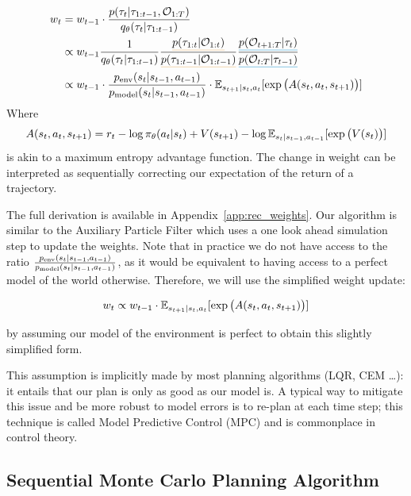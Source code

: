 \begin{align}
w_t 
&= w_{t-1} \cdot \frac{p(\traj_t |\traj_{1:t-1}, \gO_{1:T})}{q_\parampol(\traj_t | \traj_{1:t-1})} \nonumber\\
&\propto w_{t-1}   \frac{1}{ q_\parampol(\traj_t | \traj_{1:t-1})} \frac{\mathunderline{alpha}{p(\traj_{1:t} | \gO_{1:t})}}{ \mathunderline{alpha}{p(\traj_{1:t-1} | \gO_{1:t-1})}} \frac{ \mathunderline{beta}{p(\gO_{t+1:T} | \traj_{t})}}{ \mathunderline{beta}{p(\gO_{t:T} | \traj_{t-1})}}   \nonumber\\
&\propto w_{t-1} \cdot \frac{\penv(s_t | s_{t-1}, a_{t-1})}{\pmodel(s_t | s_{t-1}, a_{t-1})} \cdot \E_{s_{t+1} | s_t, a_t} [ \exp \big( A(s_t, a_t, s_{t+1}) \big)] \nonumber
\end{align}
Where \begin{equation}
\label{eq:maxent_advantage}
A(s_t, a_t, s_{t+1}) = r_t -  \log \pi_\theta(a_t | s_t) + V(s_{t+1}) - \log \mathbb{E}_{s_{t} | s_{t-1}, a_{t-1}} [ \exp \big( V(s_{t}) \big)]
\end{equation}
is akin to a maximum entropy advantage function. The change in weight can be interpreted as sequentially correcting our expectation of the return of a trajectory.


\noindent The full derivation is available in Appendix~\ref{app:rec_weights}. Our algorithm is similar to the Auxiliary Particle Filter \citep{pitt1999filtering} which uses a one look ahead simulation step to update the weights.
 Note that in practice we do not have access to the ratio $\frac{p_{\text{env}}(s_t | s_{t-1}, a_{t-1})}{p_{\rm{model}}(s_t | s_{t-1}, a_{t-1})}$, as it would be equivalent to having access to a perfect model of the world otherwise. Therefore, we will use the simplified weight update:
 
 $$w_t \propto w_{t-1} \cdot \mathbb{E}_{s_{t+1} | s_t, a_t} [ \exp \big( A(s_t, a_t, s_{t+1}) \big)]$$
 
 by assuming our model of the environment is perfect to obtain this slightly simplified form.
 
 This assumption is implicitly made by most planning algorithms (LQR, CEM \dots): it entails that our plan is only as good as our model is. A typical way to mitigate this issue and be more robust to model errors is to re-plan at each time step; this technique is called Model Predictive Control (MPC) and is commonplace in control theory.


\subsection{Sequential Monte Carlo Planning Algorithm}


